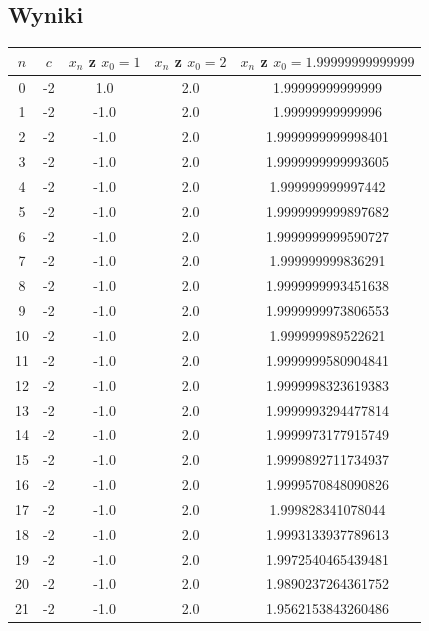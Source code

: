 \documentclass{article}
\begin{document}
\subsection{Wyniki}
\begin{table}[H]
\begin{adjustbox}{center}
\begin{tabular}{|c|c|c|c|c|}
    \hline
    $n$ & $c$ & $x_n$ z $x_0 = 1$ & $x_n$ z $x_0 = 2$ & $x_n$ z $x_0 = 1.99999999999999$\\
    \hline
    0 & -2 & 1.0 & 2.0 & 1.99999999999999\\
    \hline
    1 & -2 & -1.0 & 2.0 & 1.99999999999996\\
    \hline
    2 & -2 & -1.0 & 2.0 & 1.9999999999998401\\
    \hline
    3 & -2 & -1.0 & 2.0 & 1.9999999999993605\\
    \hline
    4 & -2 & -1.0 & 2.0 & 1.999999999997442\\
    \hline
    5 & -2 & -1.0 & 2.0 & 1.9999999999897682\\
    \hline
    6 & -2 & -1.0 & 2.0 & 1.9999999999590727\\
    \hline
    7 & -2 & -1.0 & 2.0 & 1.999999999836291\\
    \hline
    8 & -2 & -1.0 & 2.0 & 1.9999999993451638\\
    \hline
    9 & -2 & -1.0 & 2.0 & 1.9999999973806553\\
    \hline
    10 & -2 & -1.0 & 2.0 & 1.999999989522621\\
    \hline
    11 & -2 & -1.0 & 2.0 & 1.9999999580904841\\
    \hline
    12 & -2 & -1.0 & 2.0 & 1.9999998323619383\\
    \hline
    13 & -2 & -1.0 & 2.0 & 1.9999993294477814\\
    \hline
    14 & -2 & -1.0 & 2.0 & 1.9999973177915749\\
    \hline
    15 & -2 & -1.0 & 2.0 & 1.9999892711734937\\
    \hline
    16 & -2 & -1.0 & 2.0 & 1.9999570848090826\\
    \hline
    17 & -2 & -1.0 & 2.0 & 1.999828341078044\\
    \hline
    18 & -2 & -1.0 & 2.0 & 1.9993133937789613\\
    \hline
    19 & -2 & -1.0 & 2.0 & 1.9972540465439481\\
    \hline
    20 & -2 & -1.0 & 2.0 & 1.9890237264361752\\
    \hline
    21 & -2 & -1.0 & 2.0 & 1.9562153843260486\\

\end{tabular}
\end{adjustbox}
\end{table}
\end{document}
